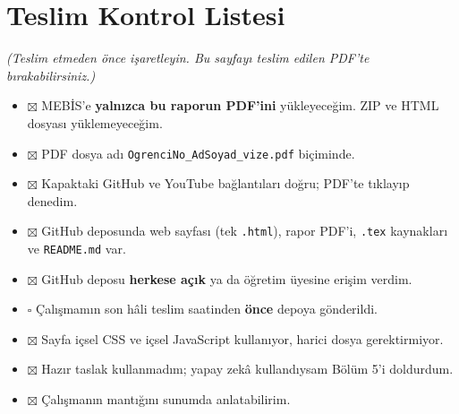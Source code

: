 \documentclass[12pt,a4paper]{article}
\newcommand{\aciklama}[1]{{\color{gray}\itshape (#1)}}
\begin{document}
\newpage

\appendix
\section{Teslim Kontrol Listesi}
\aciklama{Teslim etmeden önce işaretleyin. Bu sayfayı teslim edilen PDF'te bırakabilirsiniz.}
\begin{itemize}
  \item[] $\boxtimes$ MEBİS'e \textbf{yalnızca bu raporun PDF'ini} yükleyeceğim. ZIP ve HTML dosyası yüklemeyeceğim.
  \item[] $\boxtimes$ PDF dosya adı \texttt{OgrenciNo\_AdSoyad\_vize.pdf} biçiminde.
  \item[] $\boxtimes$ Kapaktaki GitHub ve YouTube bağlantıları doğru; PDF'te tıklayıp denedim.
  \item[] $\boxtimes$ GitHub deposunda web sayfası (tek \texttt{.html}), rapor PDF'i, \texttt{.tex} kaynakları ve \texttt{README.md} var.
  \item[] $\boxtimes$ GitHub deposu \textbf{herkese açık} ya da öğretim üyesine erişim verdim.
  \item[] $\square$ Çalışmamın son hâli teslim saatinden \textbf{önce} depoya gönderildi.
  \item[] $\boxtimes$ Sayfa içsel CSS ve içsel JavaScript kullanıyor, harici dosya gerektirmiyor.
  \item[] $\boxtimes$ Hazır taslak kullanmadım; yapay zekâ kullandıysam Bölüm 5'i doldurdum.
  \item[] $\boxtimes$ Çalışmanın mantığını sunumda anlatabilirim.
\end{itemize}
\end{document}

